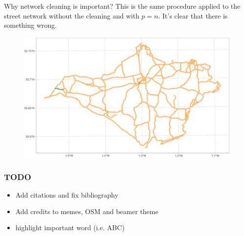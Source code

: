 \documentclass[c,10pt,pdftex]{beamer}
\begin{document}
\begin{frame}{Why network cleaning is important?}
\vspace{-0.25cm}
This is the same procedure applied to the street network without the cleaning and with $p = n$. It's clear that there is something wrong.
\begin{figure}
	\centering
	\includegraphics[width=\linewidth]{images/importance_of_network_cleaning}
\end{figure}
\end{frame}

\begin{frame}
\frametitle{TODO}
\begin{itemize}
	\item Add citations and fix bibliography
	\item Add credits to memes, OSM and beamer theme
	\item highlight important word (i.e. \alert{ABC})
\end{itemize}
\end{frame}
\end{document}
